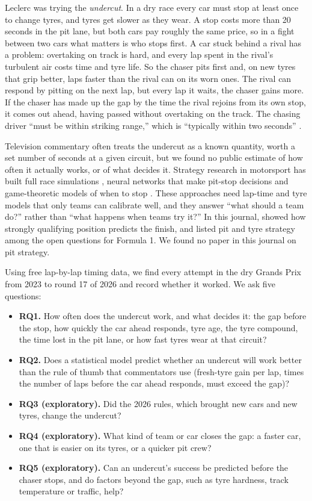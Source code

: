 \documentclass[12pt]{article}
\begin{document}
Leclerc was trying the \emph{undercut}. In a dry race every car must stop at least once to change tyres, and tyres get slower as they wear. A stop costs more than 20 seconds in the pit lane, but both cars pay roughly the same price, so in a fight between two cars what matters is who stops first. A car stuck behind a rival has a problem: overtaking on track is hard, and every lap spent in the rival's turbulent air costs time and tyre life. So the chaser pits first and, on new tyres that grip better, laps faster than the rival can on its worn ones. The rival can respond by pitting on the next lap, but every lap it waits, the chaser gains more. If the chaser has made up the gap by the time the rival rejoins from its own stop, it comes out ahead, having passed without overtaking on the track. The chasing driver ``must be within striking range,'' which is ``typically within two seconds'' \citep{palmer2019singapore}.

Television commentary often treats the undercut as a known quantity, worth a set number of seconds at a given circuit, but we found no public estimate of how often it actually works, or of what decides it. Strategy research in motorsport has built full race simulations \citep{bekker2009planning,heilmeier2020monte}, neural networks that make pit-stop decisions \citep{heilmeier2020virtual} and game-theoretic models of when to stop \citep{aguad2024pit}. These approaches need lap-time and tyre models that only teams can calibrate well, and they answer ``what should a team do?'' rather than ``what happens when teams try it?'' In this journal, \citet{weissbock2025qualifying} showed how strongly qualifying position predicts the finish, and listed pit and tyre strategy among the open questions for Formula 1. We found no paper in this journal on pit strategy.

Using free lap-by-lap timing data, we find every attempt in the dry Grands Prix from 2023 to round 17 of 2026 and record whether it worked. We ask five questions:

\begin{itemize}
\item \textbf{RQ1.} How often does the undercut work, and what decides it: the gap before the stop, how quickly the car ahead responds, tyre age, the tyre compound, the time lost in the pit lane, or how fast tyres wear at that circuit?
\item \textbf{RQ2.} Does a statistical model predict whether an undercut will work better than the rule of thumb that commentators use (fresh-tyre gain per lap, times the number of laps before the car ahead responds, must exceed the gap)?
\item \textbf{RQ3 (exploratory).} Did the 2026 rules, which brought new cars and new tyres, change the undercut?
\item \textbf{RQ4 (exploratory).} What kind of team or car closes the gap: a faster car, one that is easier on its tyres, or a quicker pit crew?
\item \textbf{RQ5 (exploratory).} Can an undercut's success be predicted before the chaser stops, and do factors beyond the gap, such as tyre hardness, track temperature or traffic, help?
\end{itemize}
\end{document}
